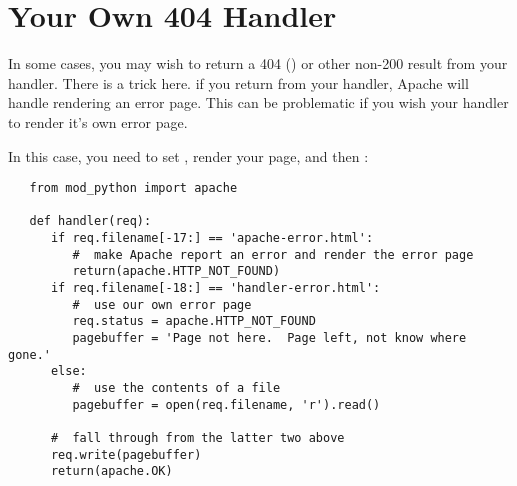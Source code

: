 \section{Your Own 404 Handler\label{tut-404-handler}}

In some cases, you may wish to return a 404 () or
other non-200 result from your handler.  There is a trick here.  if you
return  from your handler, Apache will handle
rendering an error page.  This can be problematic if you wish your handler
to render it's own error page.

In this case, you need to set ,
render your page, and then :

\begin{verbatim}
   from mod_python import apache

   def handler(req):
      if req.filename[-17:] == 'apache-error.html':
         #  make Apache report an error and render the error page
         return(apache.HTTP_NOT_FOUND)
      if req.filename[-18:] == 'handler-error.html':
         #  use our own error page
         req.status = apache.HTTP_NOT_FOUND
         pagebuffer = 'Page not here.  Page left, not know where gone.'
      else:
         #  use the contents of a file
         pagebuffer = open(req.filename, 'r').read()

      #  fall through from the latter two above
      req.write(pagebuffer)
      return(apache.OK)
\end{verbatim}
